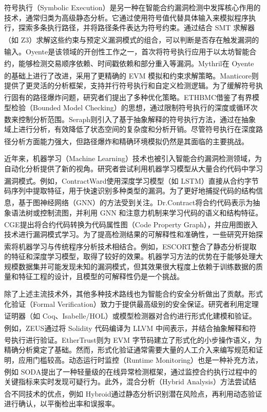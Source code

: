 \documentclass[print, master, vlined, timesmath]{DissertUESTC}
\begin{document}
符号执行（Symbolic Execution）是另一种在智能合约漏洞检测中发挥核心作用的技术，通常归类为高级静态分析。它通过使用符号值代替具体输入来模拟程序执行，探索多条执行路径，并将路径条件表达为符号约束。通过结合 SMT 求解器（如 Z3\textsuperscript{\cite{...}}）求解这些约束与预定义漏洞模式的组合，可以判断是否存在触发漏洞的输入。Oyente\textsuperscript{\cite{...}}是该领域的开创性工作之一，首次将符号执行应用于以太坊智能合约，能够检测交易顺序依赖、时间戳依赖和部分重入等漏洞。Mythril\textsuperscript{\cite{...}}在 Oyente 的基础上进行了改进，采用了更精确的 EVM 模拟和约束求解策略。Manticore\textsuperscript{\cite{...}}则提供了更灵活的分析框架，支持并行符号执行和自定义检测逻辑。为了缓解符号执行固有的路径爆炸问题，研究者们提出了多种优化策略。ETHBMC\textsuperscript{\cite{...}}借鉴了有界模型检验（Bounded Model Checking）的思想，通过限制符号执行的深度或循环次数来控制分析范围。Seraph\textsuperscript{\cite{...}}则引入了基于抽象解释的符号执行方法，通过在抽象域上进行分析，有效降低了状态空间的复杂度和分析开销。尽管符号执行在深度路径分析方面能力强大，但路径爆炸和精确环境模拟仍然是其面临的主要挑战\textsuperscript{\cite{...}}。

近年来，机器学习（Machine Learning）技术也被引入智能合约漏洞检测领域，为自动化分析提供了新的视角。研究者尝试利用机器学习模型从大量合约代码中学习漏洞模式。例如，ContractWard\textsuperscript{\cite{...}}使用深度学习模型（如 LSTM）直接从合约字节码序列中提取特征，用于快速识别多种类型的漏洞。为了更好地捕捉代码的结构信息，基于图神经网络（GNN）的方法受到关注。Dr.Contract\textsuperscript{\cite{...}}将合约代码表示为抽象语法树或控制流图，并利用 GNN 和注意力机制来学习代码的语义和结构特征。CGE\textsuperscript{\cite{...}}提出将合约代码转换为代码属性图（Code Property Graph），并应用图嵌入技术进行漏洞模式学习。为了提高检测结果的可解释性和准确性，一些研究开始探索将机器学习与传统程序分析技术相结合。例如，ESCORT\textsuperscript{\cite{...}}整合了静态分析提取的特征和深度学习模型，取得了较好的效果。机器学习方法的优势在于能够处理大规模数据集并可能发现未知的漏洞模式，但其效果很大程度上依赖于训练数据的质量和特征工程的设计，且模型的可解释性仍是一个挑战。

除了上述主流技术外，其他多种技术路线也为智能合约安全分析做出了贡献。形式化验证（Formal Verification）致力于提供最高级别的安全保证。研究者利用定理证明器（如 Coq、Isabelle/HOL）或模型检测器对合约进行形式化建模和验证\textsuperscript{\cite{...}}\textsuperscript{\cite{...}}。例如，ZEUS\textsuperscript{\cite{...}}通过将 Solidity 代码编译为 LLVM 中间表示，并结合抽象解释和符号执行进行验证。EtherTrust\textsuperscript{\cite{...}}则为 EVM 字节码建立了形式化的小步操作语义，为精确分析奠定了基础。然而，形式化验证通常需要大量的人工介入来编写规范和证明，应用门槛较高。动态运行时监控（Runtime Monitoring）也是一种补充方法，例如 SODA\textsuperscript{\cite{...}}提出了一种轻量级的在线异常检测框架，通过监控合约执行过程中的关键指标来实时发现可疑行为。此外，混合分析（Hybrid Analysis）方法尝试结合不同技术的优点，例如 Hybroid\textsuperscript{\cite{...}}通过静态分析识别潜在风险点，再利用动态验证进行确认，以平衡检出率和误报率。
\end{document}

